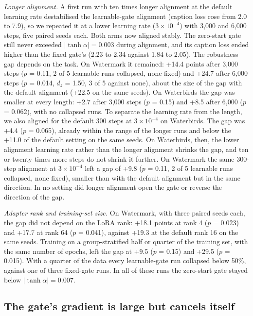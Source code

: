 \emph{Longer alignment.} A first run with ten times longer alignment at the default learning rate destabilised the
learnable-gate alignment (caption loss rose from 2.0 to 7.9), so we repeated it at a lower learning rate
(\(3 \times 10^{-4}\)) with 3,000 and 6,000 steps, five paired seeds each. Both arms now aligned stably. The zero-start
gate still never exceeded \(|\tanh\alpha| = 0.003\) during alignment, and its caption loss ended higher than the fixed
gate's (2.23 to 2.34 against 1.84 to 2.05). The robustness gap depends on the task. On Watermark it remained: +14.4
points after 3,000 steps (\(p\) = 0.11, 2 of 5 learnable runs collapsed, none fixed) and +24.7 after 6,000 steps
(\(p\) = 0.014, \(d_z\) = 1.50, 3 of 5 against none), about the size of the gap with the default alignment (+22.5 on
the same seeds). On Waterbirds the gap was smaller at every length: +2.7 after 3,000 steps (\(p\) = 0.15) and +8.5 after 6,000
(\(p\) = 0.062), with no collapsed runs. To separate the learning rate from the length, we also aligned for the
default 300 steps at \(3 \times 10^{-4}\) on Waterbirds. The gap was +4.4 (\(p\) = 0.065), already within the range of
the longer runs and below the +11.0 of the default setting on the same seeds. On Waterbirds, then, the lower
alignment learning rate rather than the longer alignment shrinks the gap, and ten or twenty times more steps do not
shrink it further. On Watermark the same 300-step alignment at \(3 \times 10^{-4}\) left a gap of +9.8 (\(p\) = 0.11,
2 of 5 learnable runs collapsed, none fixed), smaller than with the default alignment but in the same direction. In
no setting did longer alignment open the gate or reverse the direction of the gap.

\emph{Adapter rank and training-set size.} On Watermark, with three paired seeds each, the gap did not depend on the LoRA
rank: +18.1 points at rank 4 (\(p\) = 0.023) and +17.7 at rank 64 (\(p\) = 0.041), against +19.3 at the default rank 16
on the same seeds. Training on a group-stratified half or quarter of the training set, with the same number of
epochs, left the gap at +9.5 (\(p\) = 0.15) and +29.5 (\(p\) = 0.015). With a quarter of the data every learnable-gate
run collapsed below 50\%, against one of three fixed-gate runs. In all of these runs the zero-start gate stayed below
\(|\tanh\alpha| = 0.007\).

\subsection{The gate's gradient is large but cancels itself}

